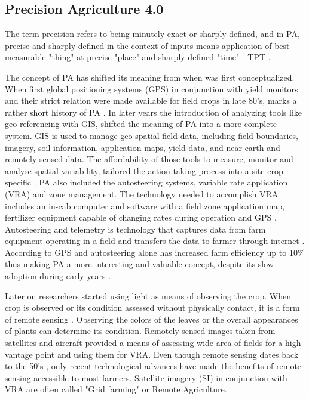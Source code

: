 \documentclass[review]{elsarticle}
\begin{document}
\subsection{Precision Agriculture 4.0}

The term precision refers to being minutely exact or sharply defined, and in PA, precise and sharply defined in the context of inputs means application of best measurable "thing" at precise "place" and sharply defined "time" - TPT \cite{Pierce_1994, Manfrini2009}. 

The concept of PA has shifted its meaning from when was first conceptualized. When first global positioning systems (GPS) in conjunction with yield monitors and their strict relation were made available for field crops in late 80's, marks a rather short history of PA \cite{Zude_Sasse_2016}. In later years the introduction of analyzing tools like geo-referencing with GIS, shifted the meaning of PA into a more complete system. GIS is used to manage geo-spatial field data, including field boundaries, imagery, soil information, application maps, yield data, and near-earth and remotely sensed data. The affordability of those tools to measure, monitor and analyse spatial variability, tailored the action-taking process into a site-crop-specific \cite{Stafford_2000}. PA also included the autosteering systems, variable rate application (VRA) and zone management. The technology needed to accomplish VRA includes an in-cab computer and software with a field zone application map, fertilizer equipment capable of changing rates during operation and GPS \cite{Chen_2012}. Autosteering and telemetry is technology that captures data from farm equipment operating in a field and transfers the data to farmer through internet \cite{Pickett20041}. According to \cite{Hedley_2014} GPS and autosteering alone has increased farm efficiency up to 10\%  thus making PA a more interesting and valuable concept, despite its slow adoption during early years \cite{Pierpaoli_2013}. 

Later on researchers started using light as means of observing the crop. When crop is observed or its condition assessed without physically contact, it is a form of remote sensing \cite{Huang_2018}. Observing the colors of the leaves or the overall appearances of plants can determine its condition. Remotely sensed images taken from satellites and aircraft provided a means of assessing wide area of fields for a high vantage point and using them for VRA. Even though remote sensing dates back to the 50's \cite{Bastiaanssen_2000}, only recent technological advances have made the benefits of remote sensing accessible to most farmers. Satellite imagery (SI) in conjunction with VRA are often called "Grid farming" or Remote Agriculture. 
\end{document}
